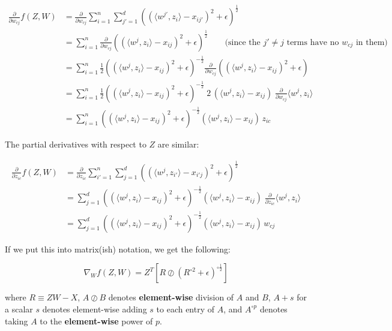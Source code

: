 \documentclass{article}
\begin{document}
\begin{align*}
\frac{\partial}{\partial w_{cj}} f(Z,W)
  &= \frac{\partial}{\partial w_{cj}} \sum_{i=1}^n\sum_{j'=1}^d \left( (\langle w^{j'}, z_i\rangle - x_{ij'})^2 + \epsilon \right)^{\frac12} \\
  &= \sum_{i=1}^n \frac{\partial}{\partial w_{cj}} \left( (\langle w^{j}, z_i\rangle - x_{ij})^2 + \epsilon \right)^{\frac12}  \qquad \text{(since the $j' \ne j$ terms have no $w_{cj}$ in them)} \\
  &= \sum_{i=1}^n \frac12 \left( (\langle w^{j}, z_i\rangle - x_{ij})^2 + \epsilon \right)^{-\frac12} \frac{\partial}{\partial w_{cj}} \left( (\langle w^{j}, z_i\rangle - x_{ij})^2 + \epsilon \right) \\
  &= \sum_{i=1}^n \frac12  \left( (\langle w^{j}, z_i\rangle - x_{ij})^2 + \epsilon \right)^{-\frac12} \;2\,  (\langle w^{j}, z_i\rangle - x_{ij}) \; \frac{\partial}{\partial w_{cj}} \langle w^{j}, z_i\rangle \\
  &= \sum_{i=1}^n \left( (\langle w^{j}, z_i\rangle - x_{ij})^2 + \epsilon \right)^{-\frac12}  (\langle w^j, z_i\rangle - x_{ij}) \, z_{ic}
\end{align*}

The partial derivatives with respect to $Z$ are similar:

\begin{align*}
\frac{\partial}{\partial z_{ic}} f(Z,W)
  &= \frac{\partial}{\partial z_{ic}} \sum_{i'=1}^n \sum_{j=1}^d  \left( (\langle w^j, z_{i'}\rangle - x_{i'j})^2 + \epsilon \right)^{\frac12}\\
  &= \sum_{j=1}^d  \left( (\langle w^j, z_{i}\rangle - x_{ij})^2 + \epsilon \right)^{-\frac12}   (\langle w^j, z_{i}\rangle - x_{ij}) \; \frac{\partial}{\partial z_{ic}} \langle w^j, z_i\rangle \\
  &= \sum_{j=1}^d  \left( (\langle w^j, z_i\rangle - x_{ij})^2 + \epsilon \right)^{-\frac12}  (\langle w^j, z_i\rangle - x_{ij}) \, w_{cj}
\end{align*}

If we put this into matrix(ish) notation, we get the following:

\[
\nabla_W f(Z,W) = Z^T \left[ R \oslash \left(R^{\circ 2} + \epsilon\right)^{\circ \frac12}  \right]
\]

where $R\equiv ZW-X$,
$A \oslash B$ denotes \textbf{element-wise} division of $A$ and $B$,
$A + s$ for a scalar $s$ denotes element-wise adding $s$ to each entry of $A$,
and $A^{\circ p}$ denotes taking $A$ to the \textbf{element-wise} power of $p$.
\end{document}
